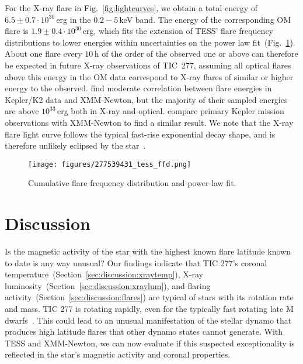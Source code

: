 \documentclass[twocolumn]{aastex631}
\begin{document}
For the X-ray flare in Fig.~\ref{fig:lightcurves}, we obtain a total energy of $6.5\pm0.7\cdot10^{30}\,$erg in the $0.2-5\,$keV band. The energy of the corresponding OM flare is $1.9\pm0.4\cdot 10^{30}\,$erg, which fits the extension of TESS' flare frequency distributions to lower energies within uncertainties on the power law fit~(Fig.~\ref{fig:ffd}). About one flare every $10\,$h of the order of the observed one or above can therefore be expected in future X-ray observations of TIC~277, assuming all optical flares above this energy in the OM data correspond to X-ray flares of similar or higher energy to the observed. \citet{guarcello2019simultaneous} find moderate correlation between flare energies in Kepler/K2 data and XMM-Newton, but the majority of their sampled energies are above $10^{33}\,$erg both in X-ray and optical. \citet{kuznetsov2021stellar} compare primary Kepler mission observations with XMM-Newton to find a similar result. We note that the X-ray flare light curve follows the typical fast-rise exponential decay shape, and is therefore unlikely eclipsed by the star~\citep{johnstone2012soft}.


\begin{figure}
    \begin{centering}
        \texttt{[image: figures/277539431\_tess\_ffd.png]}
        \caption{
         Cumulative flare frequency distribution and power law fit.
        }
        \label{fig:ffd}
    \end{centering}
\end{figure}

\section{Discussion}
\label{sec:discussion}

Is the magnetic activity of the star with the highest known flare latitude known to date is any way unusual? Our findings indicate that TIC 277's coronal temperature~(Section~\ref{sec:discussion:xraytemp}), X-ray luminosity~(Section~\ref{sec:discussion:xraylum}), and flaring activity~(Section~\ref{sec:discussion:flares}) are typical of stars with its rotation rate and mass. TIC 277 is rotating rapidly, even for the typically fast rotating late M dwarfs~\citep{medina2022galactic}. This could lead to an unusual manifestation of the stellar dynamo that produces high latitude flares that other dynamo states cannot generate. With TESS and XMM-Newton, we can now evaluate if this suspected exceptionality is reflected in the star's magnetic activity and coronal properties. 
\end{document}
